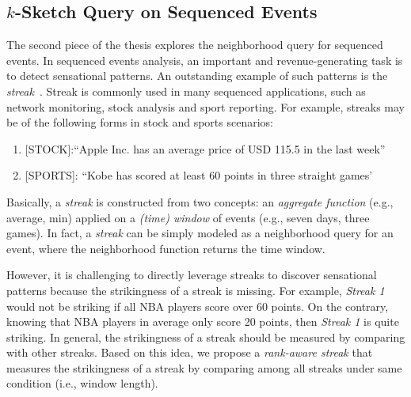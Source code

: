 \subsection{$k$-Sketch Query on Sequenced Events}
The second piece of the thesis explores the neighborhood
query for sequenced events. 
In sequenced events analysis, an important
and revenue-generating task is to detect sensational patterns.
An outstanding example of such patterns is the \emph{streak}~\cite{zhang2014discovering}. 
Streak is commonly used in many sequenced applications,
such as network monitoring, stock analysis
and sport reporting. For example, streaks may be of the following forms in stock and sports scenarios:
\begin{enumerate}
	\item{[STOCK]:``Apple Inc. has an average price of USD 115.5 in the last week''}
	\item{[SPORTS]: ``Kobe has scored at least 60 points in three straight games' }
\end{enumerate}
Basically, a \emph{streak} is constructed from two concepts: an \emph{aggregate function} (e.g., average, min)
applied on a \emph{(time) window} of events (e.g., seven days, three games). In fact, a \emph{streak} can be simply modeled as a neighborhood query for an event, where the neighborhood function returns the time window.

%
%

However, it is challenging to directly leverage streaks to discover sensational patterns because
the strikingness of a streak is missing.
For example, \emph{Streak 1} would not be striking if all NBA players score over 60 points. 
On the contrary, knowing that NBA players in average only score 20 points, then \emph{Streak 1} is quite striking. In general, the strikingness of a streak should be measured by comparing with other streaks.
Based on this idea, we propose a \emph{rank-aware streak} that measures the strikingness of
a streak by comparing among all streaks under same condition (i.e., window length).



